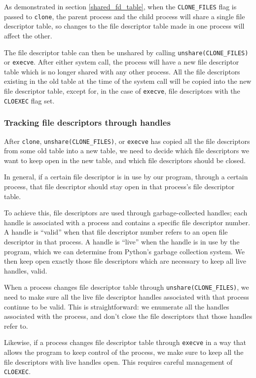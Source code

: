 \documentclass[letterpaper,twocolumn,10pt]{article}
\begin{document}
As demonstrated in section \ref{shared_fd_table},
when the \verb|CLONE_FILES| flag is passed to \texttt{clone},
the parent process and the child process will share a single file descriptor table,
so changes to the file descriptor table made in one process will affect the other.

The file descriptor table can then be unshared by calling \verb|unshare(CLONE_FILES)| or \texttt{execve}.
After either system call, the process will have a new file descriptor table
which is no longer shared with any other process.
All the file descriptors existing in the old table at the time of the system call
will be copied into the new file descriptor table,
except for, in the case of \texttt{execve}, file descriptors with the \texttt{CLOEXEC} flag set.
\subsubsection{Tracking file descriptors through handles}\label{handles}
After \texttt{clone}, \verb|unshare(CLONE_FILES)|, or \texttt{execve}
has copied all the file descriptors from some old table into a new table,
we need to decide which file descriptors we want to keep open in the new table,
and which file descriptors should be closed.

In general, if a certain file descriptor is in use by our program,
through a certain process,
that file descriptor should stay open in that process's file descriptor table.

To achieve this, file descriptors are used through garbage-collected handles;
each handle is associated with a process and contains a specific file descriptor number.
A handle is ``valid''
when that file descriptor number refers to an open file descriptor in that process.
A handle is ``live''
when the handle is in use by the program, which we can determine
from Python's garbage collection system.
We then keep open exactly those file descriptors which are necessary to keep all live handles, valid.

When a process changes file descriptor table through \verb|unshare(CLONE_FILES)|,
we need to make sure all the live file descriptor handles associated with that process continue to be valid.
This is straightforward:
we enumerate all the handles associated with the process,
and don't close the file descriptors that those handles refer to.

Likewise, if a process changes file descriptor table through \texttt{execve}
in a way that allows the program to keep control of the process,
we make sure to keep all the file descriptors with live handles open.
This requires careful management of \texttt{CLOEXEC}.
\end{document}

